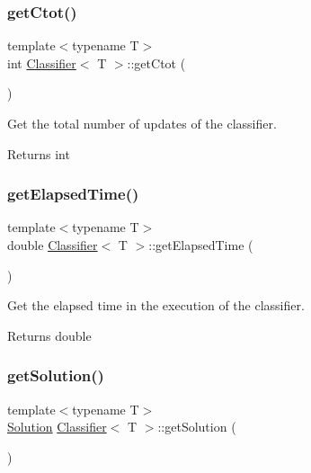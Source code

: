 \mbox{\label{class_classifier_aefd89af30ccd3e38194946bacecdf82a}} 
\subsubsection{\texorpdfstring{get\+Ctot()}{getCtot()}}
{\footnotesize\ttfamily template$<$typename T$>$ \\
int \hyperlink{class_classifier}{Classifier}$<$ T $>$\+::get\+Ctot (\begin{DoxyParamCaption}{ }\end{DoxyParamCaption})\hspace{0.3cm}{\ttfamily [inline]}}



Get the total number of updates of the classifier. 

\begin{DoxyReturn}{Returns}
int 
\end{DoxyReturn}
\mbox{\label{class_classifier_abbed7a8ea8050ae19a2c4c5f4a5e6002}} 
\subsubsection{\texorpdfstring{get\+Elapsed\+Time()}{getElapsedTime()}}
{\footnotesize\ttfamily template$<$typename T$>$ \\
double \hyperlink{class_classifier}{Classifier}$<$ T $>$\+::get\+Elapsed\+Time (\begin{DoxyParamCaption}{ }\end{DoxyParamCaption})\hspace{0.3cm}{\ttfamily [inline]}}



Get the elapsed time in the execution of the classifier. 

\begin{DoxyReturn}{Returns}
double 
\end{DoxyReturn}
\mbox{\label{class_classifier_a225887f545e5ad0a2bb414f969771cca}} 
\subsubsection{\texorpdfstring{get\+Solution()}{getSolution()}}
{\footnotesize\ttfamily template$<$typename T$>$ \\
\hyperlink{class_solution}{Solution} \hyperlink{class_classifier}{Classifier}$<$ T $>$\+::get\+Solution (\begin{DoxyParamCaption}{ }\end{DoxyParamCaption})\hspace{0.3cm}{\ttfamily [inline]}}




